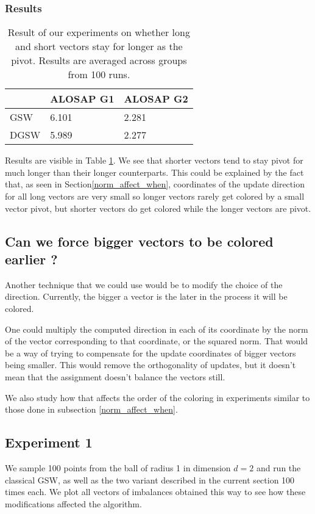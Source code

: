 \documentclass[12pt]{article}
\begin{document}
\subsubsection{Results}
\begin{center}
\begin{table}[h]
\begin{tabular}{l|ll}
 &ALOSAP G1&ALOSAP G2\\
\hline
GSW&6.101&2.281\\
DGSW&5.989&2.277
\end{tabular}
\caption{Result of our experiments on whether long and short vectors stay for longer as the pivot. Results are averaged across groups from 100 runs.}
\label{pivot_longer}
\end{table}
\end{center}
Results are visible in Table \ref{pivot_longer}. We see that shorter vectors tend to stay pivot for much longer than their longer counterparts. This could be explained by the fact that, as seen in Section\ref{norm_affect_when}, coordinates of the update direction for all long vectors are very small so longer vectors rarely get colored by a small vector pivot, but shorter vectors do get colored while the longer vectors are pivot.

\subsection{Can we force bigger vectors to be colored earlier ?}
Another technique that we could use would be to modify the choice of the direction. Currently, the bigger a vector is the later in the process it will be colored. 

One could multiply the computed direction in each of its coordinate by the norm of the vector corresponding to that coordinate, or the squared norm. That would be a way of trying to compensate for the update coordinates of bigger vectors being smaller. This would remove the orthogonality of updates, but it doesn't mean that the assignment doesn't balance the vectors still.

We also study how that affects the order of the coloring in experiments similar to those done in subsection \ref{norm_affect_when}.
\subsection{Experiment 1}
We sample 100 points from the ball of radius 1 in dimension $d=2$ and run the classical GSW, as well as the two variant described in the current section 100 times each. We plot all vectors of imbalances obtained this way to see how these modifications affected the algorithm.
\end{document}
